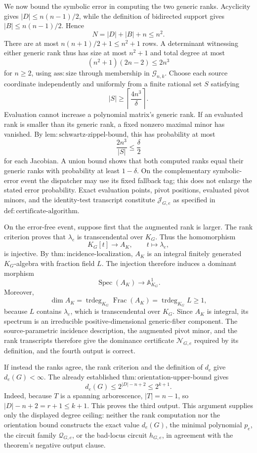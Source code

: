 We now bound the symbolic error in computing the two generic ranks.  Acyclicity gives \(|D|\leq n(n-1)/2\), while the definition of bidirected support gives \(|B|\leq n(n-1)/2\).  Hence
\[
N=|D|+|B|+n\leq n^2.
\]
There are at most \(n(n+1)/2+1\leq n^2+1\) rows.  A determinant witnessing either generic rank thus has size at most \(n^2+1\) and total degree at most
\[
(n^2+1)(2n-2)\leq 2n^3
\]
for \(n\geq2\), using \(\mathrm{ass:size}\) through membership in \(\mathcal G_{n,k}\).  Choose each source coordinate independently and uniformly from a finite rational set \(S\) satisfying
\[
|S|\geq\left\lceil\frac{4n^3}{\delta}\right\rceil.
\]
Evaluation cannot increase a polynomial matrix's generic rank.  If an evaluated rank is smaller than its generic rank, a fixed nonzero maximal minor has vanished.  By \(\mathrm{lem:schwartz\mbox{-}zippel\mbox{-}bound}\), this has probability at most
\[
\frac{2n^3}{|S|}\leq\frac{\delta}{2}
\]
for each Jacobian.  A union bound shows that both computed ranks equal their generic ranks with probability at least \(1-\delta\).  On the complementary symbolic-error event the dispatcher may use its fixed fallback tag; this does not enlarge the stated error probability.  Exact evaluation points, pivot positions, evaluated pivot minors, and the identity-test transcript constitute \(\mathcal J_{G,e}\) as specified in \(\mathrm{def:certificate\mbox{-}algorithm}\).

On the error-free event, suppose first that the augmented rank is larger.  The rank criterion proves that \(\lambda_e\) is transcendental over \(K_G\).  Thus the homomorphism
\[
K_G[t]\longrightarrow A_K,
\qquad t\longmapsto\lambda_e,
\]
is injective.  By \(\mathrm{thm:incidence\mbox{-}localization}\), \(A_K\) is an integral finitely generated \(K_G\)-algebra with fraction field \(L\).  The injection therefore induces a dominant morphism
\[
\operatorname{Spec}(A_K)\longrightarrow\mathbb A^1_{K_G}.
\]
Moreover,
\[
\dim A_K
=\operatorname{trdeg}_{K_G}\operatorname{Frac}(A_K)
=\operatorname{trdeg}_{K_G}L
\geq1,
\]
because \(L\) contains \(\lambda_e\), which is transcendental over \(K_G\).  Since \(A_K\) is integral, its spectrum is an irreducible positive-dimensional generic-fiber component.  The source-parametric incidence description, the augmented pivot minor, and the rank transcripts therefore give the dominance certificate \(\mathcal N_{G,e}\) required by its definition, and the fourth output is correct.

If instead the ranks agree, the rank criterion and the definition of \(d_e\) give \(d_e(G)<\infty\).  The already established \(\mathrm{thm:orientation\mbox{-}upper\mbox{-}bound}\) gives
\[
d_e(G)\leq2^{|D|-n+2}\leq2^{k+1}.
\]
Indeed, because \(T\) is a spanning arborescence, \(|T|=n-1\), so \(|D|-n+2=r+1\leq k+1\).  This proves the third output.  This argument supplies only the displayed degree ceiling: neither the rank computation nor the orientation bound constructs the exact value \(d_e(G)\), the minimal polynomial \(p_e\), the circuit family \(\mathcal Q_{G,e}\), or the bad-locus circuit \(h_{G,e}\), in agreement with the theorem's negative output clause.


